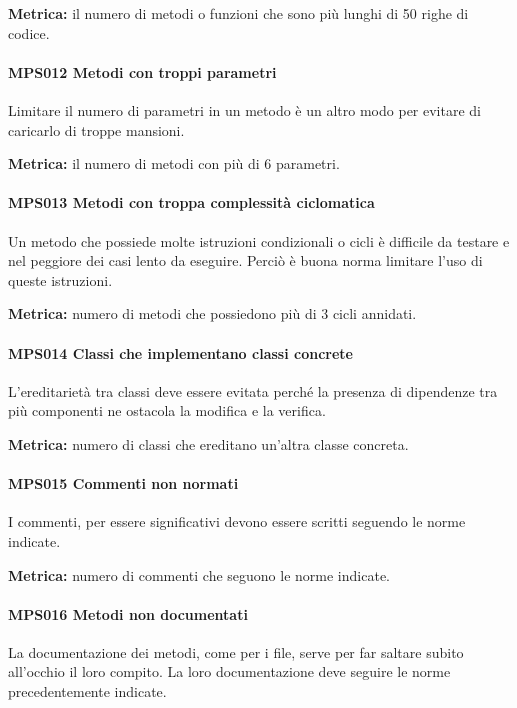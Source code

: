         \textbf{Metrica:} il numero di metodi o funzioni che sono più lunghi di 50 righe di codice.
        
        \paragraph{MPS012 Metodi con troppi parametri}
        Limitare il numero di parametri in un metodo è un altro modo per evitare di caricarlo di troppe mansioni.
        
        \textbf{Metrica:} il numero di metodi con più di 6 parametri.
        
        \paragraph{MPS013 Metodi con troppa complessità ciclomatica}
        Un metodo che possiede molte istruzioni condizionali o cicli è difficile da testare e nel peggiore dei casi lento da eseguire. Perciò è buona norma limitare l'uso di queste istruzioni.
        
        \textbf{Metrica:} numero di metodi che possiedono più di 3 cicli annidati.
        
        \paragraph{MPS014 Classi che implementano classi concrete}
        L'ereditarietà tra classi deve essere evitata perché la presenza di dipendenze tra più componenti ne ostacola la modifica e la verifica.
        
        \textbf{Metrica:} numero di classi che ereditano un'altra classe concreta.
        
        \paragraph{MPS015 Commenti non normati}
        I commenti, per essere significativi devono essere scritti seguendo le norme indicate.
        
        \textbf{Metrica:} numero di commenti che seguono le norme indicate.
        
        \paragraph{MPS016 Metodi non documentati}
        La documentazione dei metodi, come per i file, serve per far saltare subito all'occhio il loro compito. La loro documentazione deve seguire le norme precedentemente indicate.
        
